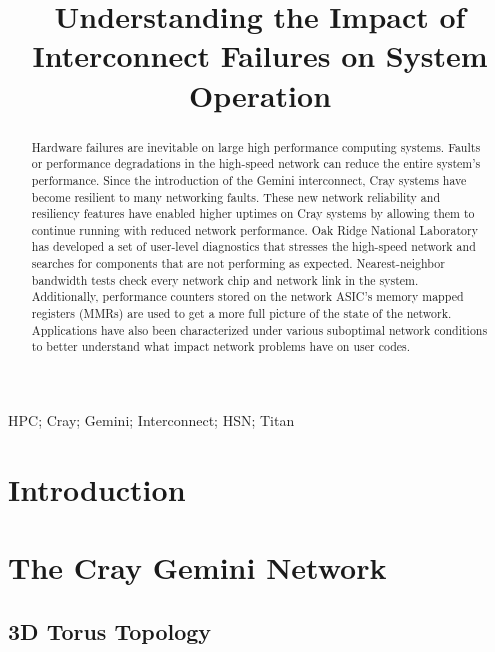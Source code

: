 \documentclass[10pt, conference, compsocconf]{IEEEtran}
\begin{document}
\title{Understanding the Impact of Interconnect Failures on System Operation}

\author{
}

\maketitle

\begin{abstract}
Hardware failures are inevitable on large high performance computing systems.
Faults or performance degradations in the high-speed network can reduce the
entire system’s performance. Since the introduction of the Gemini interconnect,
Cray systems have become resilient to many networking faults. These new network
reliability and resiliency features have enabled higher uptimes on Cray systems
by allowing them to continue running with reduced network performance. Oak
Ridge National Laboratory has developed a set of user-level diagnostics that
stresses the high-speed network and searches for components that are not
performing as expected. Nearest-neighbor bandwidth tests check every network
chip and network link in the system. Additionally, performance counters stored
on the network ASIC’s memory mapped registers (MMRs) are used to get a more
full picture of the state of the network. Applications have also been
characterized under various suboptimal network conditions to better understand
what impact network problems have on user codes.
\end{abstract}

\begin{IEEEkeywords}
HPC; Cray; Gemini; Interconnect; HSN; Titan
\end{IEEEkeywords}

\section{Introduction}

\section{The Cray Gemini Network}

\subsection{3D Torus Topology}
\end{document}
